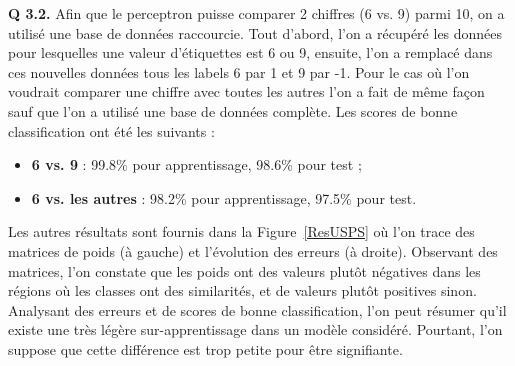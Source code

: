 \documentclass[a4paper,11pt]{article}
\theoremstyle{plain}
\theoremstyle{definition}
\begin{document}
\textbf{Q 3.2.} Afin que le perceptron puisse comparer 2 chiffres (6 vs. 9) parmi 10, on a utilisé une base de données raccourcie. Tout d'abord, l'on a récupéré les données pour lesquelles une valeur d'étiquettes est 6 ou 9, ensuite, l'on a remplacé dans ces nouvelles données tous les labels 6 par 1 et 9 par -1. Pour le cas où l'on voudrait comparer une chiffre avec toutes les autres l'on a fait de même façon sauf que l'on a utilisé une base de données complète. Les scores de bonne classification ont été les suivants :

\begin{itemize}
    \item \textbf{6 vs. 9} : 99.8\% pour apprentissage, 98.6\% pour test ;
    \item \textbf{6 vs. les autres} : 98.2\% pour apprentissage, 97.5\% pour test.
\end{itemize}
Les autres résultats sont fournis dans la Figure~\ref{ResUSPS} où l'on trace des matrices de poids (à gauche) et l'évolution des erreurs (à droite). Observant des matrices, l'on constate que les poids ont des valeurs plutôt négatives dans les régions où les classes ont des similarités, et de valeurs plutôt positives sinon. Analysant des erreurs et de scores de bonne classification, l'on peut résumer qu'il existe une très légère sur-apprentissage dans un modèle considéré. Pourtant, l'on suppose que cette différence est trop petite pour être signifiante.
\end{document}
